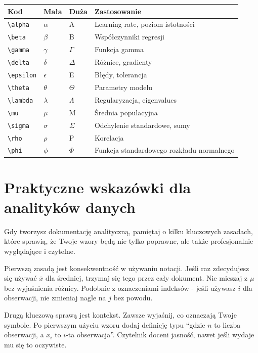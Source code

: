 \documentclass[
  polish,
  letterpaper,
  DIV=11,
  numbers=noendperiod]{scrreprt}
\newcounter{none} %
\begin{document}
{\def\LTcaptype{none} %
\begin{longtable}[]{@{}llll@{}}
\toprule\noalign{}
Kod & Mała & Duża & Zastosowanie \\
\midrule\noalign{}
\endhead
\bottomrule\noalign{}
\endlastfoot
\texttt{\textbackslash{}alpha} & \(\alpha\) & A & Learning rate, poziom
istotności \\
\texttt{\textbackslash{}beta} & \(\beta\) & B & Współczynniki
regresji \\
\texttt{\textbackslash{}gamma} & \(\gamma\) & \(\Gamma\) & Funkcja
gamma \\
\texttt{\textbackslash{}delta} & \(\delta\) & \(\Delta\) & Różnice,
gradienty \\
\texttt{\textbackslash{}epsilon} & \(\epsilon\) & E & Błędy,
tolerancja \\
\texttt{\textbackslash{}theta} & \(\theta\) & \(\Theta\) & Parametry
modelu \\
\texttt{\textbackslash{}lambda} & \(\lambda\) & \(\Lambda\) &
Regularyzacja, eigenvalues \\
\texttt{\textbackslash{}mu} & \(\mu\) & M & Średnia populacyjna \\
\texttt{\textbackslash{}sigma} & \(\sigma\) & \(\Sigma\) & Odchylenie
standardowe, sumy \\
\texttt{\textbackslash{}rho} & \(\rho\) & P & Korelacja \\
\texttt{\textbackslash{}phi} & \(\phi\) & \(\Phi\) & Funkcja
standardowego rozkładu normalnego \\
\end{longtable}
}

\section{Praktyczne wskazówki dla analityków
danych}\label{praktyczne-wskazuxf3wki-dla-analitykuxf3w-danych}

Gdy tworzysz dokumentację analityczną, pamiętaj o kilku kluczowych
zasadach, które sprawią, że Twoje wzory będą nie tylko poprawne, ale
także profesjonalnie wyglądające i czytelne.

Pierwszą zasadą jest konsekwentność w używaniu notacji. Jeśli raz
zdecydujesz się używać \(\bar{x}\) dla średniej, trzymaj się tego przez
cały dokument. Nie mieszaj z \(\mu\) bez wyjaśnienia różnicy. Podobnie z
oznaczeniami indeksów - jeśli używasz \(i\) dla obserwacji, nie zmieniaj
nagle na \(j\) bez powodu.

Drugą kluczową sprawą jest kontekst. Zawsze wyjaśnij, co oznaczają Twoje
symbole. Po pierwszym użyciu wzoru dodaj definicję typu ``gdzie \(n\) to
liczba obserwacji, a \(x_i\) to \(i\)-ta obserwacja''. Czytelnik doceni
jasność, nawet jeśli wydaje mu się to oczywiste.
\end{document}
